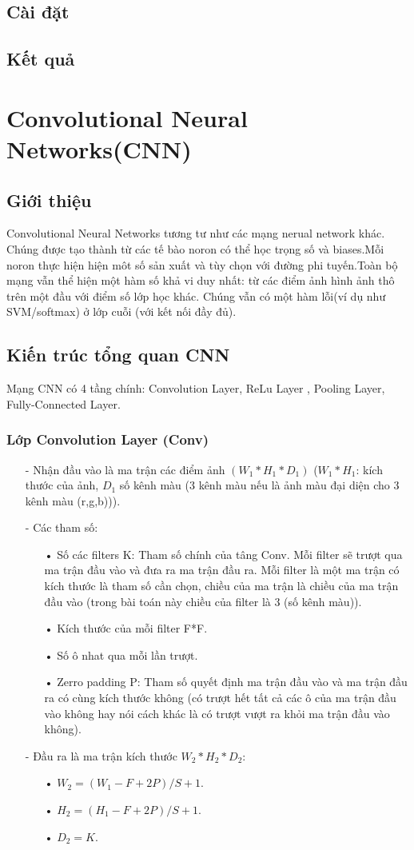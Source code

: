 \documentclass[a4paper,12pt]{report}
\begin{document}
\subsection{Cài đặt}
\subsection{Kết quả}
\section{Convolutional Neural Networks(CNN)}
\subsection{Giới thiệu}
Convolutional Neural Networks tương tư như các mạng nerual network khác. Chúng được tạo thành từ các tế bào noron có thể học trọng số và biases.Mỗi noron thực hiện hiện môt số sản xuất và tùy chọn với đường phi tuyến.Toàn bộ mạng vẫn thể hiện một hàm số khả vi duy nhất: từ các điểm ảnh hình ảnh thô trên một đầu với điểm số lớp học khác. Chúng vẫn có một hàm lỗi(ví dụ như SVM/softmax) ở lớp cuỗi (với kết nối đầy đủ).
\subsection{Kiến trúc tổng quan CNN}
Mạng CNN có 4 tầng chính: Convolution Layer, ReLu Layer , Pooling Layer, Fully-Connected Layer.
\subsubsection{Lớp Convolution Layer (Conv)}
\begin{itemize}
\item[-] Nhận đầu vào là ma trận các điểm ảnh $(W_1*H_1*D_1)$ ($W_1*H_1$: kích thước của ảnh, $D_1$ số kênh màu (3 kênh màu nếu là ảnh màu đại diện cho 3 kênh màu (r,g,b))).
\item[-] Các tham số:
\begin{itemize}
\item[•] Số các filters K: Tham số chính của tâng Conv. Mỗi filter sẽ trượt qua ma trận đầu vào và đưa ra ma trận đầu ra. Mỗi filter là một ma trận có kích thước là tham số cần chọn, chiều của ma trận là chiều của ma trận đầu vào (trong bài toán này chiều của filter là 3 (số kênh màu)).
\item[•] Kích thước của mỗi filter F*F.
\item[•] Số ô nhat qua mỗi lần trượt.
\item[•] Zerro padding P: Tham số quyết định ma trận đầu vào và ma trận đầu ra có cùng kích thước không (có trượt hết tất cả các ô của ma trận đầu vào không hay nói cách khác là có trượt vượt ra khỏi ma trận đầu vào không).
\end{itemize}
\item[-] Đầu ra là ma trận kích thước $W_2*H_2*D_2$:
\begin{itemize}
\item[•] $W_2 = (W_1 - F + 2P)/S + 1$.
\item[•] $H_2 = (H_1 - F + 2P)/S + 1$.
\item[•] $D_2 = K$.
\end{itemize}
\end{itemize}
\end{document}
